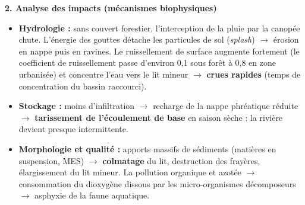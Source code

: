 \documentclass[11pt]{article}
\begin{document}
\begin{experience}
\textbf{2. Analyse des impacts (mécanismes biophysiques)}\par
\begin{itemize}
    \item \textbf{Hydrologie :} sans couvert forestier, l'interception de la pluie par la canopée chute. L'énergie des gouttes détache les particules de sol (\emph{splash}) $\rightarrow$ érosion en nappe puis en ravines. Le ruissellement de surface augmente fortement (le coefficient de ruissellement passe d'environ 0,1 sous forêt à 0,8 en zone urbanisée) et concentre l'eau vers le lit mineur $\rightarrow$ \textbf{crues rapides} (temps de concentration du bassin raccourci).
    \item \textbf{Stockage :} moins d'infiltration $\rightarrow$ recharge de la nappe phréatique réduite $\rightarrow$ \textbf{tarissement de l'écoulement de base} en saison sèche : la rivière devient presque intermittente.
    \item \textbf{Morphologie et qualité :} apports massifs de sédiments (matières en suspension, MES) $\rightarrow$ \textbf{colmatage} du lit, destruction des frayères, élargissement du lit mineur. La pollution organique et azotée $\rightarrow$ consommation du dioxygène dissous par les micro-organismes décomposeurs $\rightarrow$ asphyxie de la faune aquatique.
\end{itemize}


\end{experience}
\end{document}
